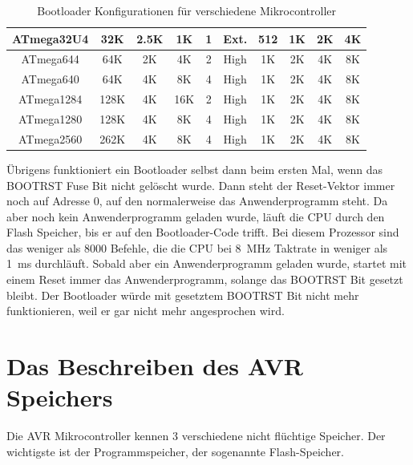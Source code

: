 \begin{table}[H]
\begin{center}
\begin{tabular}{| c | c | c | c | c | c | c | c | c | c |}
    \hline
              ATmega32U4 & 32K   & 2.5K  & 1K  &  1   & Ext.  & 512  & 1K & 2K  & 4K  \\
    \hline
              ATmega644 & 64K   & 2K   & 4K   &  2   & High  & 1K   & 2K  & 4K  & 8K  \\
    \hline
              ATmega640 & 64K   & 4K   & 8K   &  4   & High  & 1K   & 2K  & 4K  & 8K  \\
    \hline
             ATmega1284 & 128K  & 4K   & 16K  &  2   & High  & 1K   & 2K  & 4K  & 8K  \\
    \hline
             ATmega1280 & 128K  & 4K   & 8K   &  4   & High  & 1K   & 2K  & 4K  & 8K  \\
    \hline
             ATmega2560 & 262K  & 4K   & 8K   &  4   & High  & 1K   & 2K  & 4K  & 8K  \\
    \hline
    \end{tabular}
  \end{center}
  \caption{Bootloader Konfigurationen für verschiedene Mikrocontroller}
  \label{tab:bootsz}
\end{table}

Übrigens funktioniert ein Bootloader selbst dann beim ersten Mal, wenn
das BOOTRST Fuse Bit nicht gelöscht wurde. Dann steht der Reset-Vektor
immer noch auf Adresse 0, auf den normalerweise das Anwenderprogramm steht.
Da aber noch kein Anwenderprogramm geladen wurde, läuft die CPU
durch den Flash Speicher, bis er auf den Bootloader-Code trifft.
Bei diesem Prozessor sind das weniger als 8000 Befehle, die die CPU bei
8~MHz Taktrate in weniger als 1~ms durchläuft.
Sobald aber ein Anwenderprogramm geladen wurde, startet mit einem Reset
immer das Anwenderprogramm, solange das BOOTRST Bit gesetzt bleibt.
Der Bootloader würde mit gesetztem BOOTRST Bit nicht mehr funktionieren,
weil er gar nicht mehr angesprochen wird.


\section{Das Beschreiben des AVR Speichers}

Die AVR Mikrocontroller kennen 3 verschiedene nicht flüchtige Speicher.
Der wichtigste ist der Programmspeicher, der sogenannte Flash-Speicher.



